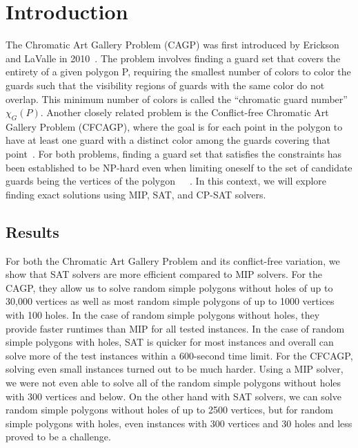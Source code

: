 \chapter{Introduction}
The Chromatic Art Gallery Problem (CAGP) was first introduced by Erickson and LaValle in 2010~\cite{erickson2010chromatic}. The problem involves finding a guard set that covers the entirety of a given polygon P, requiring the smallest number of colors to color the guards such that the visibility regions of guards with the same color do not overlap. This minimum number of colors is called the ``chromatic guard number'' $\chi_G(P)$. Another closely related problem is the Conflict-free Chromatic Art Gallery Problem (CFCAGP), where the goal is for each point in the polygon to have at least one guard with a distinct color among the guards covering that point~\cite{bartschi2014conflict}. For both problems, finding a guard set that satisfies the constraints has been established to be NP-hard even when limiting oneself to the set of candidate guards being the vertices of the polygon~\cite{fekete2014chromatic}~\cite{erickson2011many}~\cite{iwamoto2022vertex}. In this context, we will explore finding exact solutions using MIP, SAT, and CP-SAT solvers.

\section{Results}
For both the Chromatic Art Gallery Problem and its conflict-free variation, we show that SAT solvers are more efficient compared to MIP solvers. For the CAGP, they allow us to solve random simple polygons without holes of up to 30,000 vertices as well as most random simple polygons of up to 1000 vertices with 100 holes. In the case of random simple polygons without holes, they provide faster runtimes than MIP for all tested instances. In the case of random simple polygons with holes, SAT is quicker for most instances and overall can solve more of the test instances within a 600-second time limit.
For the CFCAGP, solving even small instances turned out to be much harder.
Using a MIP solver, we were not even able to solve all of the random simple polygons without holes with 300 vertices and below. On the other hand with SAT solvers, we can solve random simple polygons without holes of up to 2500 vertices, but for random simple polygons with holes, even instances with 300 vertices and 30 holes and less proved to be a challenge. 

